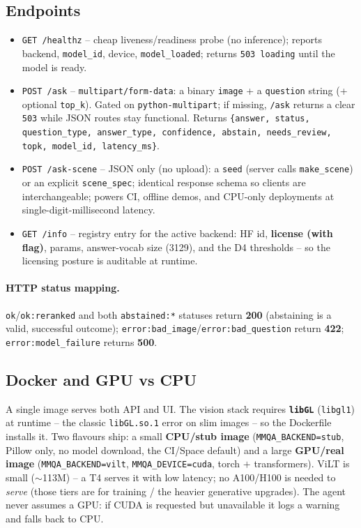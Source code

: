 \documentclass[12pt,a4paper]{article}
\begin{document}
\subsection{Endpoints}

\begin{itemize}\setlength\itemsep{0.15em}
  \item \texttt{GET /healthz} -- cheap liveness/readiness probe (no inference); reports backend, \texttt{model\_id}, device, \texttt{model\_loaded}; returns \texttt{503 loading} until the model is ready.
  \item \texttt{POST /ask} -- \texttt{multipart/form-data}: a binary \texttt{image} + a \texttt{question} string (+ optional \texttt{top\_k}). Gated on \texttt{python-multipart}; if missing, \texttt{/ask} returns a clear \texttt{503} while JSON routes stay functional. Returns \texttt{\{answer, status, question\_type, answer\_type, confidence, abstain, needs\_review, topk, model\_id, latency\_ms\}}.
  \item \texttt{POST /ask-scene} -- JSON only (no upload): a \texttt{seed} (server calls \texttt{make\_scene}) or an explicit \texttt{scene\_spec}; identical response schema so clients are interchangeable; powers CI, offline demos, and CPU-only deployments at single-digit-millisecond latency.
  \item \texttt{GET /info} -- registry entry for the active backend: HF id, \textbf{license (with flag)}, params, answer-vocab size (3129), and the D4 thresholds -- so the licensing posture is auditable at runtime.
\end{itemize}

\paragraph{HTTP status mapping.} \texttt{ok}/\texttt{ok:reranked} and both \texttt{abstained:*} statuses return \textbf{200} (abstaining is a valid, successful outcome); \texttt{error:bad\_image}/\texttt{error:bad\_question} return \textbf{422}; \texttt{error:model\_failure} returns \textbf{500}.

\subsection{Docker and GPU vs CPU}

A single image serves both API and UI. The vision stack requires \textbf{\texttt{libGL}} (\texttt{libgl1}) at runtime -- the classic \texttt{libGL.so.1} error on slim images -- so the Dockerfile installs it. Two flavours ship: a small \textbf{CPU/stub image} (\texttt{MMQA\_BACKEND=stub}, Pillow only, no model download, the CI/Space default) and a large \textbf{GPU/real image} (\texttt{MMQA\_BACKEND=vilt}, \texttt{MMQA\_DEVICE=cuda}, torch $+$ transformers). ViLT is small ($\sim$113M) -- a T4 serves it with low latency; no A100/H100 is needed to \emph{serve} (those tiers are for training / the heavier generative upgrades). The agent never assumes a GPU: if CUDA is requested but unavailable it logs a warning and falls back to CPU.
\end{document}
